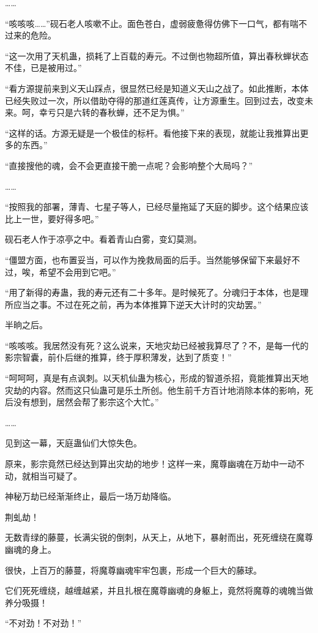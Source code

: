 \begin{this_body}
……

“咳咳咳……”砚石老人咳嗽不止。面色苍白，虚弱疲惫得仿佛下一口气，都有喘不过来的危险。

“这一次用了天机蛊，损耗了上百载的寿元。不过倒也物超所值，算出春秋蝉状态不佳，已是被用过。”

“看方源提前来到义天山踩点，很显然已经是知道义天山之战了。如此推断，本体已经失败过一次，所以借助夺得的那道红莲真传，让方源重生。回到过去，改变未来。呵，幸亏只是六转的春秋蝉，还不足为惧。”

“这样的话。方源无疑是一个极佳的标杆。看他接下来的表现，就能让我推算出更多的东西。”

“直接搜他的魂，会不会更直接干脆一点呢？会影响整个大局吗？”

……

“按照我的部署，薄青、七星子等人，已经尽量拖延了天庭的脚步。这个结果应该比上一世，要好得多吧。”

砚石老人作于凉亭之中。看着青山白雾，变幻莫测。

“僵盟方面，也布置妥当，可以作为挽救局面的后手。当然能够保留下来最好不过，唉，希望不会用到它吧。”

“用了新得的寿蛊，我的寿元还有二十多年。是时候死了。分魂归于本体，也是理所应当之事。不过在死之前，再为本体推算下逆天大计时的灾劫罢。”

半晌之后。

“咳咳咳。我居然没有死？这么说来，天地灾劫已经被我算尽了？不，是每一代的影宗智囊，前仆后继的推算，终于厚积薄发，达到了质变！”

“呵呵呵，真是有点讽刺。以天机仙蛊为核心，形成的智道杀招，竟能推算出天地灾劫的内容。然而这只仙蛊可是乐土所创。他生前千方百计地消除本体的影响，死后没有想到，居然会帮了影宗这个大忙。”

……

见到这一幕，天庭蛊仙们大惊失色。

原来，影宗竟然已经达到算出灾劫的地步！这样一来，魔尊幽魂在万劫中一动不动，就相当可疑了。

神秘万劫已经渐渐终止，最后一场万劫降临。

荆虬劫！

无数青绿的藤蔓，长满尖锐的倒刺，从天上，从地下，暴射而出，死死缠绕在魔尊幽魂的身上。

很快，上百万的藤蔓，将魔尊幽魂牢牢包裹，形成一个巨大的藤球。

它们死死缠绕，越缠越紧，并且扎根在魔尊幽魂的身躯上，竟然将魔尊的魂魄当做养分吸摄！

“不对劲！不对劲！”


\end{this_body}
